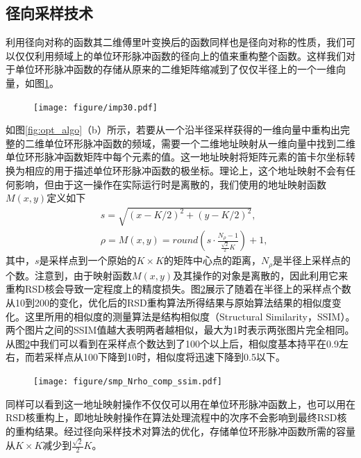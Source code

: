 \documentclass[master]{shtthesis}             %
\begin{document}
\subsection{径向采样技术}

利用径向对称的函数其二维傅里叶变换后的函数同样也是径向对称的性质\citep{baddour2011two}，我们可以仅仅利用频域上的单位环形脉冲函数的径向上的值来重构整个函数。这样我们对于单位环形脉冲函数的存储从原来的二维矩阵缩减到了仅仅半径上的一个一维向量，如图\ref{fig:imp_rad}。
\begin{figure}[!tb]
    \centering
    \texttt{[image: figure/imp30.pdf]}
    \label{fig:imp_rad}
\end{figure}

如图\ref{fig:opt_algo}（b）所示，若要从一个沿半径采样获得的一维向量中重构出完整的二维单位环形脉冲函数的频域，需要一个二维地址映射从一维向量中找到二维单位环形脉冲函数矩阵中每个元素的值。这一地址映射将矩阵元素的笛卡尔坐标转换为相应的用于描述单位环形脉冲函数的极坐标。理论上，这个地址映射不会有任何影响，但由于这一操作在实际运行时是离散的，我们使用的地址映射函数$M(x,y)$定义如下
\begin{align}
    &s=\sqrt{(x-K/2)^2+(y-K/2)^2},  \\
    &\rho = M(x, y) = round\left( s\cdot \frac{N_{\rho}-1}{\frac{\sqrt{2}}{2}K} \right)+1,\label{eq:mapping_func}
\end{align}
其中，$s$是采样点到一个原始的$K\times K$的矩阵中心点的距离，$N_\rho$是半径上采样点的个数。注意到，由于映射函数$M(x,y)$及其操作的对象是离散的，因此利用它来重构RSD核会导致一定程度上的精度损失。图\ref{fig:smp_comp}展示了随着在半径上的采样点个数从10到200的变化，优化后的RSD重构算法所得结果与原始算法结果的相似度变化。这里所用的相似度的测量算法是结构相似度（Structural Similarity，SSIM）。两个图片之间的SSIM值越大表明两者越相似，最大为1时表示两张图片完全相同。从图\ref{fig:smp_comp}中我们可以看到在采样点个数达到了100个以上后，相似度基本持平在0.9左右，而若采样点从100下降到10时，相似度将迅速下降到0.5以下。
\begin{figure}[!tb]
    \centering
    \texttt{[image: figure/smp\_Nrho\_comp\_ssim.pdf]}
    \label{fig:smp_comp}
\end{figure}

同样可以看到这一地址映射操作不仅仅可以用在单位环形脉冲函数上，也可以用在RSD核重构上，即地址映射操作在算法处理流程中的次序不会影响到最终RSD核的重构结果。经过径向采样技术对算法的优化，存储单位环形脉冲函数所需的容量从$K\times K$减少到$\frac{\sqrt{2}}{2}K$。
\end{document}
